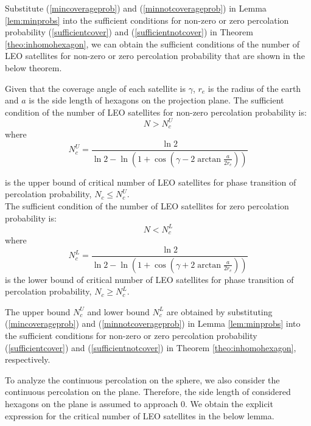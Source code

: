 \documentclass[final]{IEEEtran}
\begin{document}
Substitute (\ref{mincoverageprob}) and (\ref{minnotcoverageprob}) in Lemma \ref{lem:minprobs} into the sufficient conditions for non-zero or zero percolation probability (\ref{sufficientcover}) and (\ref{sufficientnotcover}) in Theorem \ref{theo:inhomohexagon}, we can obtain the sufficient conditions of the number of LEO satellites for non-zero or zero percolation probability that are shown in the below theorem.
\begin{theorem}
Given that the coverage angle of each satellite is $\gamma$, $r_e$ is the radius of the earth and $a$ is the side length of hexagons on the projection plane. The sufficient condition of the number of LEO satellites for non-zero percolation probability is:
\begin{equation}
    N>N_c^U
\end{equation}
where 
\begin{equation}
    N_c^U=\frac{\ln 2}{\ln 2-\ln(1+\cos(\gamma-2\arctan \frac{a}{2r_e}))}
\end{equation}

\noindent is the upper bound of critical number of LEO satellites for phase transition of percolation probability, \ie $N_c\leq N_c^U$.\\
\indent The sufficient condition of the number of LEO satellites for zero percolation probability is:
\begin{equation}
    N<N_c^L
\end{equation}
where 
\begin{equation}
    N_c^L=\frac{\ln 2}{\ln 2-\ln(1+\cos(\gamma+2\arctan \frac{a}{2r_e}))}
\end{equation}
is the lower bound of critical number of LEO satellites for phase transition of percolation probability, \ie $N_c\geq N_c^L$.
\label{theo:sufficientconditions}
\end{theorem}
\begin{IEEEproof}
The upper bound $N_c^{U}$ and lower bound $N_c^{L}$ are obtained by substituting (\ref{mincoverageprob}) and (\ref{minnotcoverageprob}) in Lemma \ref{lem:minprobs} into the sufficient conditions for non-zero or zero percolation probability (\ref{sufficientcover}) and (\ref{sufficientnotcover}) in Theorem \ref{theo:inhomohexagon}, respectively.
\end{IEEEproof}
\indent To analyze the continuous percolation on the sphere, we also consider the continuous percolation on the plane. Therefore, the side length of considered hexagons on the plane is assumed to approach 0. We obtain the explicit expression for the critical number of LEO satellites in the below lemma.
\end{document}
